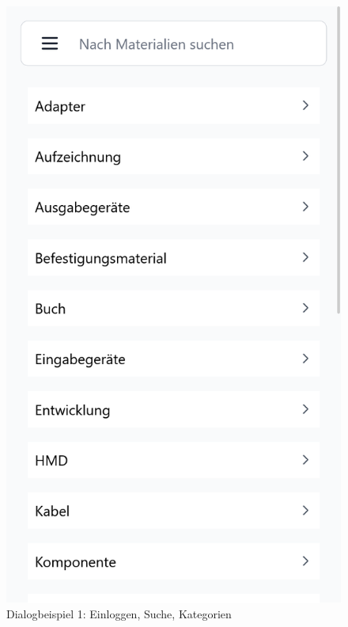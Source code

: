 \begin{figure}[p]
    \includegraphics[scale=0.17]{Bilder/Dialgobeispiel/Kategorien.png}
    \caption{Dialogbeispiel 1: Einloggen, Suche, Kategorien}\label{fig:login}
\end{figure}
